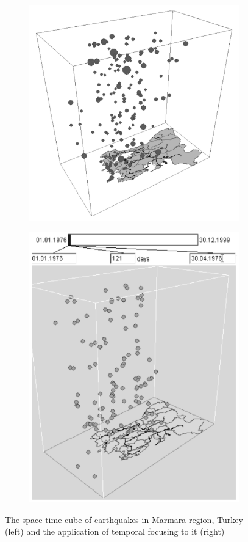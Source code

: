 \begin{figure}[hbt!]
    \centering
    \begin{subfigure}{.5\textwidth}
        \centering
        \includegraphics[width=0.8\linewidth]{graphics/2-literature-review/12a}
    \end{subfigure}%
    \begin{subfigure}{.5\textwidth}
        \centering
        \includegraphics[width=0.65\linewidth]{graphics/2-literature-review/12b}
    \end{subfigure}
    \caption{The space-time cube of earthquakes in Marmara region, Turkey (left) and the application of temporal focusing to it (right)}
    \label{fig:figure2.12}
\end{figure}

